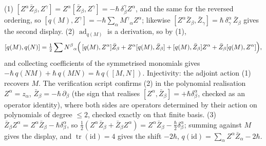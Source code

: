 (1) $[Z^\alpha\bar Z_\beta, Z^\gamma] = Z^\alpha[\bar Z_\beta, Z^\gamma] = -\hbar\,\delta^\gamma_\beta Z^\alpha$, and the same for the reversed ordering, so $[q(M), Z^\gamma] = -\hbar\sum_\alpha M^\gamma{}_\alpha Z^\alpha$; likewise $[Z^\alpha \bar Z_\beta, \bar Z_\gamma] = \hbar\,\delta^\alpha_\gamma\,\bar Z_\beta$ gives the second display.
(2) $\operatorname{ad}_{q(M)}$ is a derivation, so by (1),
\[
[q(M), q(N)] = \tfrac12\sum N^\beta{}_\alpha\Bigl(\,[q(M),Z^\alpha]\bar Z_\beta + Z^\alpha[q(M),\bar Z_\beta] + [q(M),\bar Z_\beta]Z^\alpha + \bar Z_\beta[q(M),Z^\alpha]\Bigr),
\]
and collecting coefficients of the symmetrised monomials gives $-\hbar\,q(NM) + \hbar\,q(MN) = \hbar\,q([M,N])$. Injectivity: the adjoint action (1) recovers $M$. The verification script confirms (2) in the polynomial realisation $Z^\alpha = z_\alpha$, $\bar Z_\beta = -\hbar\,\partial_\beta$ (the sign that realises $[Z^\alpha, \bar Z_\beta] = +\hbar\delta^\alpha_\beta$, checked as an operator identity), where both sides are operators determined by their action on polynomials of degree $\le 2$, checked exactly on that finite basis.
(3) $\bar Z_\beta Z^\alpha = Z^\alpha \bar Z_\beta - \hbar\delta^\alpha_\beta$, so $\tfrac12(Z^\alpha\bar Z_\beta + \bar Z_\beta Z^\alpha) = Z^\alpha\bar Z_\beta - \tfrac{\hbar}{2}\delta^\alpha_\beta$; summing against $M$ gives the display, and $\operatorname{tr}(\mathrm{id}) = 4$ gives the shift $-2\hbar$, $q(\mathrm{id}) = \sum_\alpha Z^\alpha\bar Z_\alpha - 2\hbar$.
